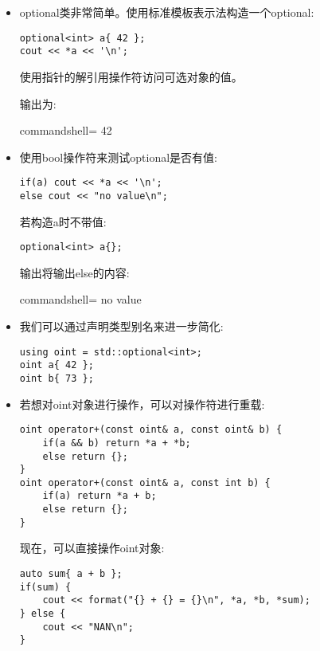 \begin{itemize}
\item 
optional类非常简单。使用标准模板表示法构造一个optional:

\begin{lstlisting}[style=styleCXX]
optional<int> a{ 42 };
cout << *a << '\n';
\end{lstlisting}

使用指针的解引用操作符访问可选对象的值。

输出为:

\begin{tcblisting}{commandshell={}}
42
\end{tcblisting}

\item 
使用bool操作符来测试optional是否有值:

\begin{lstlisting}[style=styleCXX]
if(a) cout << *a << '\n';
else cout << "no value\n";
\end{lstlisting}

若构造a时不带值:

\begin{lstlisting}[style=styleCXX]
optional<int> a{};
\end{lstlisting}

输出将输出else的内容:

\begin{tcblisting}{commandshell={}}
no value
\end{tcblisting}

\item 
我们可以通过声明类型别名来进一步简化:

\begin{lstlisting}[style=styleCXX]
using oint = std::optional<int>;
oint a{ 42 };
oint b{ 73 };
\end{lstlisting}

\item 
若想对oint对象进行操作，可以对操作符进行重载:

\begin{lstlisting}[style=styleCXX]
oint operator+(const oint& a, const oint& b) {
	if(a && b) return *a + *b;
	else return {};
}
oint operator+(const oint& a, const int b) {
	if(a) return *a + b;
	else return {};
}
\end{lstlisting}

现在，可以直接操作oint对象:

\begin{lstlisting}[style=styleCXX]
auto sum{ a + b };
if(sum) {
	cout << format("{} + {} = {}\n", *a, *b, *sum);
} else {
	cout << "NAN\n";
}
\end{lstlisting}


\end{itemize}

